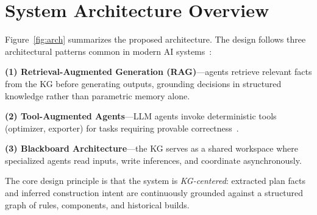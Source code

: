
\section{System Architecture Overview}
\label{sec:arch}

Figure~\ref{fig:arch} summarizes the proposed architecture.
The design follows three architectural patterns common in modern AI systems~\cite{lewis2020rag}:

\textbf{(1) Retrieval-Augmented Generation (RAG)}---agents retrieve relevant facts from the KG before generating outputs, grounding decisions in structured knowledge rather than parametric memory alone.

\textbf{(2) Tool-Augmented Agents}---LLM agents invoke deterministic tools (optimizer, exporter) for tasks requiring provable correctness~\cite{schick2023toolformer}.

\textbf{(3) Blackboard Architecture}---the KG serves as a shared workspace where specialized agents read inputs, write inferences, and coordinate asynchronously.

The core design principle is that the system is \emph{KG-centered}: extracted plan facts and inferred construction intent are continuously grounded against a structured graph of rules, components, and historical builds.

